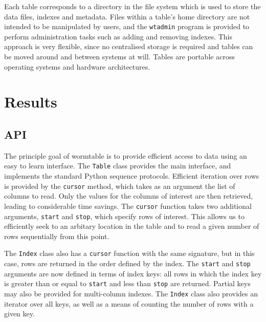 \documentclass[10pt]{bmc_article}
\newenvironment{bmcformat}{\begin{raggedright}\baselineskip20pt\sloppy\setboolean{publ}{false}}{\end{raggedright}\baselineskip20pt\sloppy}
\begin{document}
\begin{bmcformat}
Each table corresponds to a directory in the file system
which is used to store the data files, indexes and metadata.
Files within a table's home directory are not intended to be 
manipulated by users, and the \texttt{wtadmin} program is provided 
to perform administration tasks such as adding and removing 
indexes. This approach is 
very flexible, since no centralised storage is required and 
tables can be moved around and between systems at will.
Tables are portable across operating systems and hardware
architectures.


\section*{Results}

%
\subsection*{API}
The principle goal of wormtable is to provide efficient access to data 
using an easy to learn interface. 
The \texttt{Table} class provides the main interface,
and implements the standard Python sequence protocols. Efficient 
iteration over rows is provided by the \texttt{cursor} method, 
which takes as an argument the list of columns to read.
Only the values for the columns 
of interest are then retrieved, leading to considerable
time savings. The \texttt{cursor} function takes two additional 
arguments, \texttt{start} and \texttt{stop}, which specify 
rows of interest. This allows us to efficiently seek to an 
arbitary location in the table and to read a given number 
of rows sequentially from this point.

The \texttt{Index} class also has a \texttt{cursor} function
with the same signature, but in this case, rows 
are returned in the order defined by the index. The  
\texttt{start} and \texttt{stop} arguments are now defined 
in terms of index keys: all rows in which the index key
is greater than or equal to \texttt{start} and less 
than \texttt{stop} are returned. Partial keys may also be 
provided for multi-column indexes. The \texttt{Index} 
class also provides an iterator over all keys, as well 
as a means of counting the number of rows with a given 
key.


\end{bmcformat}
\end{document}
